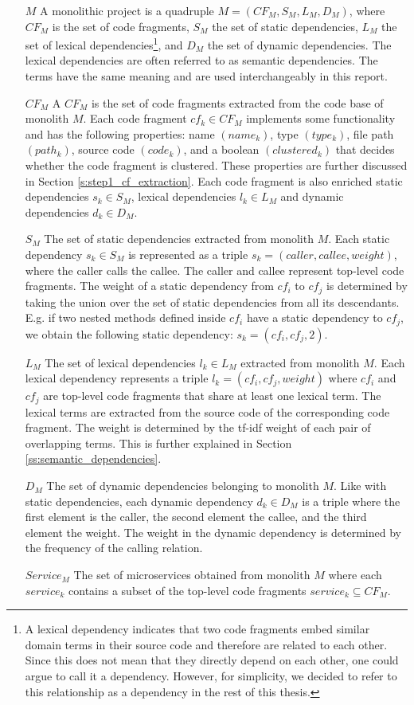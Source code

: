 \begin{itemize}
    \item[$M$] A monolithic project is a quadruple $M = (CF_M, S_M, L_M, D_M)$, where $CF_M$ is the set of code fragments, $S_M$ the set of static dependencies, $L_M$ the set of lexical dependencies\footnote{A lexical dependency indicates that two code fragments embed similar domain terms in their source code and therefore are related to each other. Since this does not mean that they directly depend on each other, one could argue to call it a dependency. However, for simplicity, we decided to refer to this relationship as a dependency in the rest of this thesis.}, and $D_M$ the set of dynamic dependencies. The lexical dependencies are often referred to as semantic dependencies. The terms have the same meaning and are used interchangeably in this report.
    \item[$CF_M$] A $CF_M$ is the set of code fragments extracted from the code base of monolith $M$. Each code fragment $cf_k \in CF_M$ implements some functionality and has the following properties: name $(name_k)$, type $(type_k)$, file path $(path_k)$, source code $(code_k)$, and a boolean $(clustered_k)$ that decides whether the code fragment is clustered. These properties are further discussed in Section \ref{s:step1_cf_extraction}. Each code fragment is also enriched static dependencies $s_k \in S_M$, lexical dependencies $l_k \in L_M$ and dynamic dependencies $d_k \in D_M$.
    \item[$S_M$] The set of static dependencies extracted from monolith $M$. Each static dependency $s_k \in S_M$ is represented as a triple $s_k = (caller, callee, weight)$, where the caller calls the callee. The caller and callee represent top-level code fragments. The weight of a static dependency from $cf_i$ to $cf_j$ is determined by taking the union over the set of static dependencies from all its descendants. E.g. if two nested methods defined inside $cf_i$ have a static dependency to $cf_j$, we obtain the following static dependency: $s_k = (cf_i, cf_j, 2)$.
    \item[$L_M$] The set of lexical dependencies $l_k \in L_M$ extracted from monolith $M$. Each lexical dependency represents a triple $l_k = (cf_i, cf_j, weight)$ where $cf_i$ and $cf_j$ are top-level code fragments that share at least one lexical term. The lexical terms are extracted from the source code of the corresponding code fragment. The weight is determined by the tf-idf weight of each pair of overlapping terms. This is further explained in Section \ref{ss:semantic_dependencies}.
    \item[$D_M$] The set of dynamic dependencies belonging to monolith $M$. Like with static dependencies, each dynamic dependency $d_k \in D_M$ is a triple where the first element is the caller, the second element the callee, and the third element the weight. The weight in the dynamic dependency is determined by the frequency of the calling relation.
    \item[$Service_M$] The set of microservices obtained from monolith $M$ where each $service_k$ contains a subset of the top-level code fragments $service_k \subseteq CF_M$.
\end{itemize}


